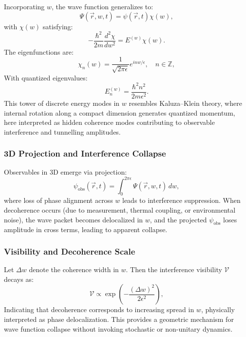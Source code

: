 \documentclass[12pt]{article}
\begin{document}
Incorporating \(w\), the wave function generalizes to:
\begin{equation}
\Psi(\vec{r}, w, t) = \psi(\vec{r}, t)\chi(w),
\end{equation}
with \(\chi(w)\) satisfying:
\begin{equation}
-\frac{\hbar^2}{2m} \frac{d^2 \chi}{dw^2} = E^{(w)} \chi(w).
\label{eq:schrodinger_w}
\end{equation}
The eigenfunctions are:
\begin{equation}
\chi_n(w) = \frac{1}{\sqrt{2\pi \epsilon}} e^{i n w / \epsilon}, \quad n \in \mathbb{Z},
\end{equation}
With quantized eigenvalues:
\begin{equation}
E_n^{(w)} = \frac{\hbar^2 n^2}{2m \epsilon^2}.
\label{eq:quantized_energy_w}
\end{equation}
This tower of discrete energy modes in \(w\) resembles Kaluza–Klein theory, where internal rotation along a compact dimension generates quantized momentum, here interpreted as hidden coherence modes contributing to observable interference and tunnelling amplitudes.

\subsubsection*{3D Projection and Interference Collapse}

Observables in 3D emerge via projection:
\begin{equation}
\psi_{\text{obs}}(\vec{r}, t) = \int_{0}^{2\pi \epsilon} \Psi(\vec{r}, w, t) \, dw,
\label{eq:3d_projection}
\end{equation}
where loss of phase alignment across \(w\) leads to interference suppression. When decoherence occurs (due to measurement, thermal coupling, or environmental noise), the wave packet becomes delocalized in \(w\), and the projected \(\psi_{\text{obs}}\) loses amplitude in cross terms, leading to apparent collapse.

\subsubsection*{Visibility and Decoherence Scale}

Let \(\Delta w\) denote the coherence width in \(w\). Then the interference visibility \(\mathcal{V}\) decays as:
\begin{equation}
\mathcal{V} \propto \exp\left( -\frac{(\Delta w)^2}{2 \epsilon^2} \right),
\label{eq:visibility_vs_w}
\end{equation}
Indicating that decoherence corresponds to increasing spread in \(w\), physically interpreted as phase delocalization. This provides a geometric mechanism for wave function collapse without invoking stochastic or non-unitary dynamics.
\end{document}
